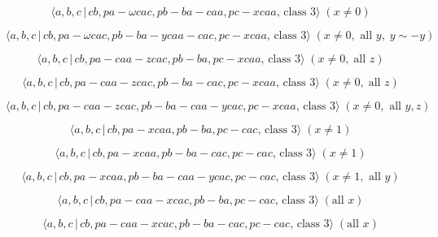 \documentclass[10pt]{article}
\begin{document}
\begin{equation}
\langle a,b,c\,|\,cb,pa-\omega cac,pb-ba-caa,pc-xcaa,\,\text{class }3\rangle
\;(x\neq 0)  \tag{7.854}
\end{equation}

\begin{equation}
\langle a,b,c\,|\,cb,pa-\omega cac,pb-ba-ycaa-cac,pc-xcaa,\,\text{class }%
3\rangle \;(x\neq 0,\text{ all }y,\;y\sim -y)  \tag{7.855}
\end{equation}

\begin{equation}
\langle a,b,c\,|\,cb,pa-caa-zcac,pb-ba,pc-xcaa,\,\text{class }3\rangle
\;(x\neq 0,\;\text{all }z)  \tag{7.856}
\end{equation}

\begin{equation}
\langle a,b,c\,|\,cb,pa-caa-zcac,pb-ba-cac,pc-xcaa,\,\text{class }3\rangle
\;(x\neq 0,\;\text{all }z)  \tag{7.857}
\end{equation}

\begin{equation}
\langle a,b,c\,|\,cb,pa-caa-zcac,pb-ba-caa-ycac,pc-xcaa,\,\text{class }%
3\rangle \;(x\neq 0,\text{ all }y,z)  \tag{7.858}
\end{equation}

\begin{equation}
\langle a,b,c\,|\,cb,pa-xcaa,pb-ba,pc-cac,\,\text{class }3\rangle \;(x \neq
1)  \tag{7.859}
\end{equation}

\begin{equation}
\langle a,b,c\,|\,cb,pa-xcaa,pb-ba-cac,pc-cac,\,\text{class }3\rangle \;(x
\neq 1)  \tag{7.860}
\end{equation}

\begin{equation}
\langle a,b,c\,|\,cb,pa-xcaa,pb-ba-caa-ycac,pc-cac,\,\text{class }3\rangle
\;(x\neq 1,\text{ all }y)  \tag{7.861}
\end{equation}

\begin{equation}
\langle a,b,c\,|\,cb,pa-caa-xcac,pb-ba,pc-cac,\,\text{class }3\rangle \;(%
\text{all }x)  \tag{7.862}
\end{equation}

\begin{equation}
\langle a,b,c\,|\,cb,pa-caa-xcac,pb-ba-cac,pc-cac,\,\text{class }3\rangle \;(%
\text{all }x)  \tag{7.863}
\end{equation}
\end{document}
